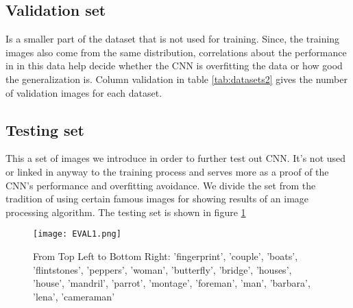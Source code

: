 \FloatBarrier

\subsection{Validation set}
Is a smaller part of the dataset that is not used for training. Since, the training images also come from the same distribution, correlations about the performance in in this data help decide whether the CNN is overfitting the data or how good the generalization is. Column validation in table \ref{tab:datasets2}  gives the number of validation images for each dataset. 

\FloatBarrier

\subsection{Testing set}
This a set of images we introduce in order to further test out CNN. It's not used or linked in anyway to the training process and serves more as a proof of the CNN's performance and overfitting avoidance. We divide the set from the tradition of using certain famous images for showing results of an image processing algorithm. The testing set is shown in figure \ref{fig:EVALim1}

\begin{figure}[tb] 
\centering 
\texttt{[image: EVAL1.png]} 
\caption[Evaluation images]{From Top Left to Bottom Right: 'fingerprint', 'couple', 'boats', 'flintstones', 'peppers', 'woman', 'butterfly', 'bridge', 'houses', 'house', 'mandril', 'parrot', 'montage', 'foreman', 'man', 'barbara', 'lena', 'cameraman'}
\label{fig:EVALim1} 
\end{figure}

\FloatBarrier

